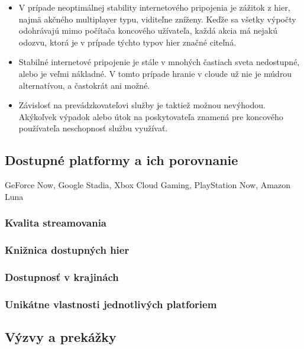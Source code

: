 \documentclass[10pt,twoside,slovak,a4paper]{article}
\begin{document}
\begin{itemize}

\item V prípade neoptimálnej stability internetového pripojenia je zážitok z hier, najmä akčného multiplayer typu, viditeľne zníženy. Keďže sa všetky výpočty odohrávajú mimo počítača koncového užívateľa, každá akcia má nejakú odozvu, ktorá je v prípade týchto typov hier značné citeľná.

\item Stabilné internetové pripojenie je stále v mnohých častiach sveta nedostupné, alebo je veľmi nákladné. V tomto prípade hranie v cloude už nie je múdrou alternatívou, a častokrát ani možné.

\item Závislosť na prevádzkovateľovi služby je taktiež možnou nevýhodou. Akýkoľvek výpadok alebo útok na poskytovateľa znamená pre koncového používateľa neschopnosť službu využívať.

\end{itemize}



\subsection{Dostupné platformy a ich porovnanie}

GeForce Now, Google Stadia, Xbox Cloud Gaming, PlayStation Now, Amazon Luna



\subsubsection{Kvalita streamovania}

\subsubsection{Knižnica dostupných hier}

\subsubsection{Dostupnosť v krajinách}

\subsubsection{Unikátne vlastnosti jednotlivých platforiem}

\subsection{Výzvy a prekážky}
\end{document}
